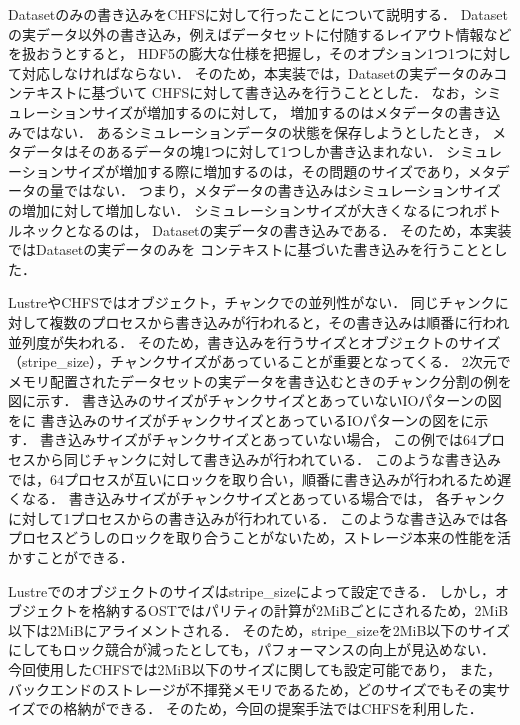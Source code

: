 \documentclass[submit,techrep,noauthor]{ipsj}
\begin{document}
Datasetのみの書き込みをCHFSに対して行ったことについて説明する．
Datasetの実データ以外の書き込み，例えばデータセットに付随するレイアウト情報などを扱おうとすると，
HDF5の膨大な仕様を把握し，そのオプション1つ1つに対して対応しなければならない．
そのため，本実装では，Datasetの実データのみコンテキストに基づいて
CHFSに対して書き込みを行うこととした．
なお，シミュレーションサイズが増加するのに対して，
増加するのはメタデータの書き込みではない．
あるシミュレーションデータの状態を保存しようとしたとき，
メタデータはそのあるデータの塊1つに対して1つしか書き込まれない．
シミュレーションサイズが増加する際に増加するのは，その問題のサイズであり，メタデータの量ではない．
つまり，メタデータの書き込みはシミュレーションサイズの増加に対して増加しない．
シミュレーションサイズが大きくなるにつれボトルネックとなるのは，
Datasetの実データの書き込みである．
そのため，本実装ではDatasetの実データのみを
コンテキストに基づいた書き込みを行うこととした．

LustreやCHFSではオブジェクト，チャンクでの並列性がない．
同じチャンクに対して複数のプロセスから書き込みが行われると，その書き込みは順番に行われ並列度が失われる．
そのため，書き込みを行うサイズとオブジェクトのサイズ（stripe\_size），チャンクサイズがあっていることが重要となってくる．
2次元でメモリ配置されたデータセットの実データを書き込むときのチャンク分割の例を図に示す．
書き込みのサイズがチャンクサイズとあっていないIOパターンの図をに
書き込みのサイズがチャンクサイズとあっているIOパターンの図をに示す．
書き込みサイズがチャンクサイズとあっていない場合，
この例では64プロセスから同じチャンクに対して書き込みが行われている．
このような書き込みでは，64プロセスが互いにロックを取り合い，順番に書き込みが行われるため遅くなる．
書き込みサイズがチャンクサイズとあっている場合では，
各チャンクに対して1プロセスからの書き込みが行われている．
このような書き込みでは各プロセスどうしのロックを取り合うことがないため，ストレージ本来の性能を活かすことができる．

Lustreでのオブジェクトのサイズはstripe\_sizeによって設定できる．
しかし，オブジェクトを格納するOSTではパリティの計算が2MiBごとにされるため，2MiB以下は2MiBにアライメントされる．
そのため，stripe\_sizeを2MiB以下のサイズにしてもロック競合が減ったとしても，パフォーマンスの向上が見込めない．
今回使用したCHFSでは2MiB以下のサイズに関しても設定可能であり，
また，バックエンドのストレージが不揮発メモリであるため，どのサイズでもその実サイズでの格納ができる．
そのため，今回の提案手法ではCHFSを利用した．
\end{document}
